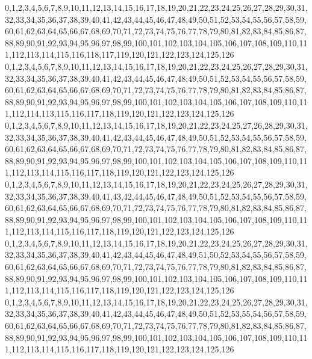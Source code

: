 \documentclass[12pt]{article}
\begin{document}
{0,1,2,3,4,5,6,7,8,9,10,11,12,13,14,15,16,17,18,19,20,21,22,23,24,25,26,27,28,29,30,31,32,33,34,35,36,37,38,39,40,41,42,43,44,45,46,47,48,49,50,51,52,53,54,55,56,57,58,59,60,61,62,63,64,65,66,67,68,69,70,71,72,73,74,75,76,77,78,79,80,81,82,83,84,85,86,87,88,89,90,91,92,93,94,95,96,97,98,99,100,101,102,103,104,105,106,107,108,109,110,111,112,113,114,115,116,118,117,119,120,121,122,123,124,125,126\\
0,1,2,3,4,5,6,7,8,9,10,11,12,13,14,15,16,17,18,19,20,21,22,23,24,25,26,27,28,29,30,31,32,33,34,35,36,37,38,39,40,41,42,43,44,45,46,47,48,49,50,51,52,53,54,55,56,57,58,59,60,61,62,63,64,65,66,67,68,69,70,71,72,73,74,75,76,77,78,79,80,81,82,83,84,85,86,87,88,89,90,91,92,93,94,95,96,97,98,99,100,101,102,103,104,105,106,107,108,109,110,111,112,114,113,115,116,117,118,119,120,121,122,123,124,125,126\\
0,1,2,3,4,5,6,7,8,9,10,11,12,13,14,15,16,17,18,19,20,21,22,23,24,25,27,26,28,29,30,31,32,33,34,35,36,37,38,39,40,41,42,43,44,45,46,47,48,49,50,51,52,53,54,55,56,57,58,59,60,61,62,63,64,65,66,67,68,69,70,71,72,73,74,75,76,77,78,79,80,81,82,83,84,85,86,87,88,89,90,91,92,93,94,95,96,97,98,99,100,101,102,103,104,105,106,107,108,109,110,111,112,113,114,115,116,117,118,119,120,121,122,123,124,125,126\\
0,1,2,3,4,5,6,7,8,9,10,11,12,13,14,15,16,17,18,19,20,21,22,23,24,25,26,27,28,29,30,31,32,33,34,35,36,37,38,39,40,41,43,42,44,45,46,47,48,49,50,51,52,53,54,55,56,57,58,59,60,61,62,63,64,65,66,67,68,69,70,71,72,73,74,75,76,77,78,79,80,81,82,83,84,85,86,87,88,89,90,91,92,93,94,95,96,97,98,99,100,101,102,103,104,105,106,107,108,109,110,111,112,113,114,115,116,117,118,119,120,121,122,123,124,125,126\\
0,1,2,3,4,5,6,7,8,9,10,11,12,13,14,15,16,17,18,19,20,21,22,23,24,25,26,27,28,29,30,31,32,33,34,35,36,37,38,39,40,41,42,43,44,45,46,47,48,49,51,50,52,53,54,55,56,57,58,59,60,61,62,63,64,65,66,67,68,69,70,71,72,73,74,75,76,77,78,79,80,81,82,83,84,85,86,87,88,89,90,91,92,93,94,95,96,97,98,99,100,101,102,103,104,105,106,107,108,109,110,111,112,113,114,115,116,117,118,119,120,121,122,123,124,125,126\\
0,1,2,3,4,5,6,7,8,9,10,11,12,13,14,15,16,17,18,19,20,21,22,23,24,25,26,27,28,29,30,31,32,33,34,35,36,37,38,39,40,41,42,43,44,45,46,47,48,49,50,51,52,53,55,54,56,57,58,59,60,61,62,63,64,65,66,67,68,69,70,71,72,73,74,75,76,77,78,79,80,81,82,83,84,85,86,87,88,89,90,91,92,93,94,95,96,97,98,99,100,101,102,103,104,105,106,107,108,109,110,111,112,113,114,115,116,117,118,119,120,121,122,123,124,125,126\\
}
\end{document}
